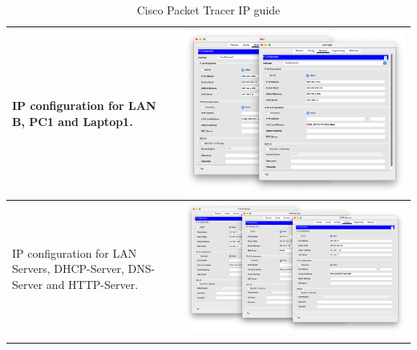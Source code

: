 \documentclass[11pt,a4paper]{report}
\begin{document}
\begin{flushleft}
\begin{center}
\begin{longtable}{ m{5cm} l }
                        IP configuration for LAN B, PC1 and Laptop1.                                                                                                                            & \includegraphics[scale=0.25 ,valign=c]{lanb-ipall}                    \\ \hline
                        IP configuration for LAN Servers, DHCP-Server, DNS-Server and HTTP-Server.                                                                                              & \includegraphics[scale=0.19 ,valign=c]{lanservers-ipall}              \\ \hline

                        \caption{Cisco Packet Tracer IP guide}
                        \label{tab:cptg1}
                    \end{longtable}
                \end{center}
        \end{flushleft}
\end{document}
